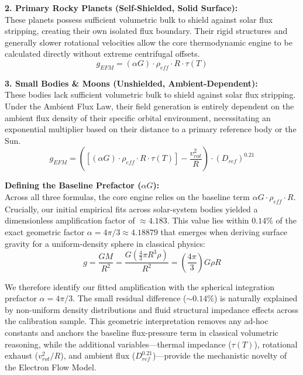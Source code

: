 \documentclass[11pt, a4paper]{article}
\begin{document}
\textbf{2. Primary Rocky Planets (Self-Shielded, Solid Surface):} \\
These planets possess sufficient volumetric bulk to shield against solar flux stripping, creating their own isolated flux boundary. Their rigid structures and generally slower rotational velocities allow the core thermodynamic engine to be calculated directly without extreme centrifugal offsets.
\begin{equation}
  g_{EFM} = (\alpha G) \cdot \rho_{eff} \cdot R \cdot \tau(T)
\end{equation}

\textbf{3. Small Bodies \& Moons (Unshielded, Ambient-Dependent):} \\
These bodies lack sufficient volumetric bulk to shield against solar flux stripping. Under the Ambient Flux Law, their field generation is entirely dependent on the ambient flux density of their specific orbital environment, necessitating an exponential multiplier based on their distance to a primary reference body or the Sun.
\begin{equation}
  g_{EFM} = \left( \left[ (\alpha G) \cdot \rho_{eff} \cdot R \cdot \tau(T) \right] - \frac{v_{rot}^2}{R} \right) \cdot (D_{ref})^{0.21}
\end{equation}

\textbf{Defining the Baseline Prefactor ($\alpha G$):} \\
Across all three formulas, the core engine relies on the baseline term $\alpha G \cdot \rho_{eff} \cdot R$. Crucially, our initial empirical fits across solar-system bodies yielded a dimensionless amplification factor of $\approx 4.183$. This value lies within $0.14\%$ of the exact geometric factor $\alpha = 4\pi/3 \approx 4.18879$ that emerges when deriving surface gravity for a uniform-density sphere in classical physics:
\begin{equation}
  g = \frac{GM}{R^2} = \frac{G \left( \frac{4}{3} \pi R^3 \rho \right)}{R^2} = \left( \frac{4\pi}{3} \right) G \rho R
\end{equation}

We therefore identify our fitted amplification with the spherical integration prefactor $\alpha = 4\pi/3$. The small residual difference ($\sim 0.14\%$) is naturally explained by non-uniform density distributions and fluid structural impedance effects across the calibration sample. This geometric interpretation removes any ad-hoc constants and anchors the baseline flux-pressure term in classical volumetric reasoning, while the additional variables—thermal impedance ($\tau(T)$), rotational exhaust ($v_{rot}^2/R$), and ambient flux ($D_{ref}^{0.21}$)—provide the mechanistic novelty of the Electron Flow Model.
\end{document}
